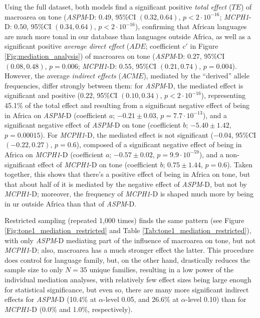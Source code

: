 \documentclass[twoside,twocolumn]{article}
\begin{document}
Using the full dataset, both models find a significant positive \textit{total effect} ($TE$) of macroarea on tone (\textit{ASPM}-D: $0.49$, 95\%CI $(0.32, 0.64)$, $p < 2\cdot10^{-16}$; \textit{MCPH1}-D:  $0.50$, 95\%CI $(0.34, 0.64)$, $p < 2\cdot10^{-16}$), confirming that African languages are much more tonal in our database than languages outside Africa, as well as a significant positive \textit{average direct effect} ($ADE$; coefficient $c'$ in Figure \ref{Fig:mediation_analysis}) of macroarea on tone (\textit{ASPM}-D: $0.27$, 95\%CI $(0.08, 0.48)$, $p = 0.006$; \textit{MCPH1}-D:  $0.55$, 95\%CI $(0.21, 0.74)$, $p = 0.004$).
However, the average \textit{indirect effects} ($ACME$), mediated by the ``derived'' allele frequencies, differ strongly between them: for \textit{ASPM}-D, the mediated effect is significant and positive ($0.22$, 95\%CI $(0.10, 0.34)$, $p < 2\cdot10^{-16}$), representing 45.1\% of the total effect and resulting from a significant negative effect of being in Africa on \textit{ASPM}-D (coefficient $a$; $-0.21 \pm0.03$, $p = 7.7\cdot10^{-13}$), and a significant negative effect of \textit{ASPM}-D on tone (coefficient $b$; $-5.40 \pm1.42$, $p = 0.00015$).
For \textit{MCPH1}-D, the mediated effect is not significant ($-0.04$, 95\%CI $(-0.22, 0.27)$, $p = 0.6$), composed of a significant negative effect of being in Africa on \textit{MCPH1}-D (coefficient $a$; $-0.57 \pm0.02$, $p = 9.9\cdot10^{-59}$), and a non-significant effect of \textit{MCPH1}-D on tone (coefficient $b$; $0.75 \pm1.44$, $p = 0.6$).
Taken together, this shows that there's a positive effect of being in Africa on tone, but that about half of it is mediated by the negative effect of \textit{ASPM}-D, but not by \textit{MCPH1}-D; moreover, the frequency of \textit{MCPH1}-D is shaped much more by being in ur outside Africa than that of \textit{ASPM}-D.

Restricted sampling (repeated 1,000 times) finds the same pattern (see Figure \ref{Fig:tone1_mediation_restricted} and Table \ref{Tab:tone1_mediation_restricted}), with only \textit{ASPM}-D mediating part of the influence of macroarea on tone, but not \textit{MCPH1}-D; also, macroarea has a much stronger effect the latter.
This procedure does control for language family, but, on the other hand, drastically reduces the sample size to only $N=35$ unique families, resulting in a low power of the individual mediation analyses, with relatively few effect sizes being large enough for statistical significance, but even so, there are many more significant indirect effects for \textit{ASPM}-D (10.4\% at $\alpha$-level 0.05, and 26.6\% at $\alpha$-level 0.10) than for \textit{MCPH1}-D (0.0\% and 1.0\%, respectively).
\end{document}
